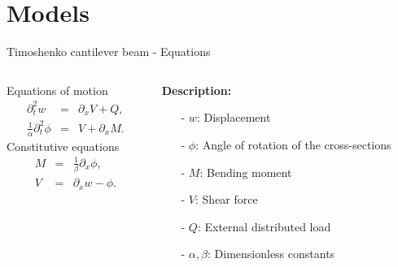 \documentclass{beamer}
\begin{document}
\section{Models}
\begin{frame}{Timoshenko cantilever beam - Equations}
    \begin{columns}[T] %
        \begin{column}{.6\textwidth}
            Equations of motion
            \begin{eqnarray*}
                \partial_{t}^{2} w &=& \partial_{x}V + Q,\\
                \frac{1}{\alpha} \partial_{t}^{2} \phi &=& V + \partial_{x}M.
            \end{eqnarray*}
            Constitutive equations
            \begin{eqnarray*}
                M &=& \frac{1}{\beta}\partial_x \phi,\\
                V &=& \partial_x w-\phi.
            \end{eqnarray*}
        \end{column}
        
        \begin{column}{.4\textwidth}
            \textbf{Description:}
            \begin{itemize}
                \item[-] \( w \): Displacement
                \item[-] \( \phi \): Angle of rotation of the cross-sections
                \item[-] \( M \): Bending moment
                \item[-] \( V \): Shear force
                \item[-] \( Q \): External distributed load
                \item[-] \( \alpha, \beta \): Dimensionless constants
            \end{itemize}
        \end{column}
    \end{columns}
\end{frame}
\end{document}
